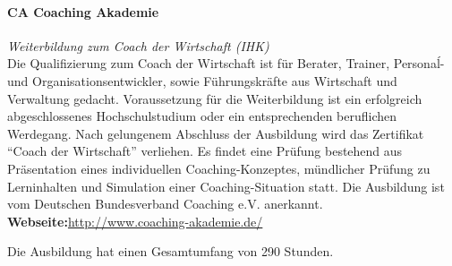 \documentclass[11pt,a4paper]{article}
\begin{document}
\paragraph{\textsf{CA Coaching Akademie}} \textsl{Weiterbildung zum Coach der Wirtschaft (IHK)}\\
Die Qualifizierung zum Coach der Wirtschaft ist für Berater, Trainer, Personaĺ- und Organisationsentwickler, sowie Führungskräfte aus Wirtschaft und Verwaltung gedacht. Voraussetzung für die Weiterbildung ist ein erfolgreich abgeschlossenes Hochschulstudium oder ein entsprechenden beruflichen Werdegang. Nach gelungenem Abschluss der Ausbildung wird das Zertifikat "`Coach der Wirtschaft"' verliehen. Es findet eine Prüfung bestehend aus Präsentation eines individuellen Coaching-Konzeptes, mündlicher Prüfung zu Lerninhalten und Simulation einer Coaching-Situation statt. Die Ausbildung ist vom Deutschen Bundesverband Coaching e.V. anerkannt.\\

\textbf{Webseite:}\textsf{\textcolor{MidnightBlue}{\url{http://www.coaching-akademie.de/}}}


Die Ausbildung hat einen Gesamtumfang von 290 Stunden.
\end{document}
